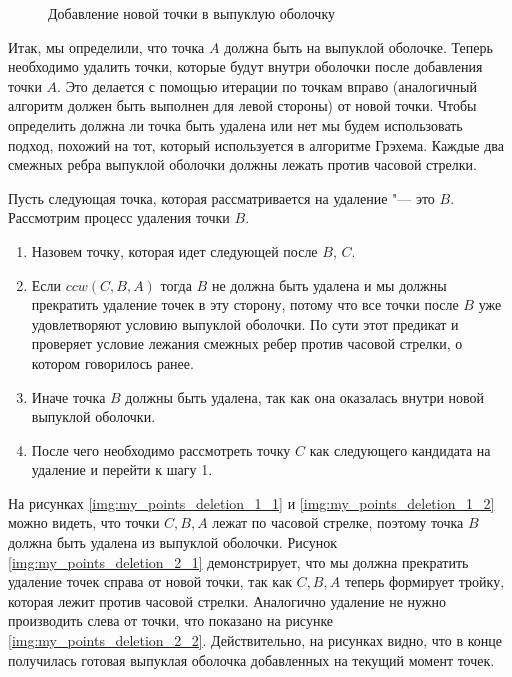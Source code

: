 \begin{figure}[hbt]
	{\centering
		\hfill
		\subbottom[\label{img:my_point_cases_1}]{%
			}
		\hfill
		\subbottom[\label{img:my_point_cases_2}]{%
			}
		\hfill
	}
	\caption{Добавление новой точки в выпуклую оболочку}
	\label{img:my_point_cases}
\end{figure}

Итак, мы определили, что точка $A$ должна быть на выпуклой оболочке. Теперь необходимо удалить точки, которые будут внутри оболочки после добавления точки $A$. Это делается с помощью итерации по точкам вправо (аналогичный алгоритм должен быть выполнен для левой стороны) от новой точки. Чтобы определить должна ли точка быть удалена или нет мы будем использовать подход, похожий на тот, который используется в алгоритме Грэхема. Каждые два смежных ребра выпуклой оболочки должны лежать против часовой стрелки.

Пусть следующая точка, которая рассматривается на удаление "--- это $B$. Рассмотрим процесс удаления точки $B$.
\begin{enumerate}
	\item Назовем точку, которая идет следующей после $B$, $C$.
	\item Если $ccw(C, B, A)$ тогда $B$ не должна быть удалена и мы должны прекратить удаление точек в эту сторону, потому что все точки после $B$ уже удовлетворяют условию выпуклой оболочки. По сути этот предикат и проверяет условие лежания смежных ребер против часовой стрелки, о котором говорилось ранее.
	\item Иначе точка $B$ должны быть удалена, так как она оказалась внутри новой выпуклой оболочки.
	\item После чего необходимо рассмотреть точку $C$ как следующего кандидата на удаление и перейти к шагу 1.
\end{enumerate}

На рисунках \ref{img:my_points_deletion_1_1} и \ref{img:my_points_deletion_1_2} можно видеть, что точки $C, B, A$ лежат по часовой стрелке, поэтому точка $B$ должна быть удалена из выпуклой оболочки. Рисунок \ref{img:my_points_deletion_2_1} демонстрирует, что мы должна прекратить удаление точек справа от новой точки, так как $C, B, A$ теперь формирует тройку, которая лежит против часовой стрелки. Аналогично удаление не нужно производить слева от точки, что показано на рисунке \ref{img:my_points_deletion_2_2}. Действительно, на рисунках видно, что в конце получилась готовая выпуклая оболочка добавленных на текущий момент точек.

